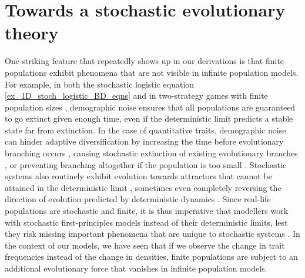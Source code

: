 \section{Towards a stochastic evolutionary theory}

One striking feature that repeatedly shows up in our derivations is that finite populations exhibit phenomena that are not visible in infinite population models. For example, in both the stochastic logistic equation \ref{ex_1D_stoch_logistic_BD_eqns} and in two-strategy games with finite population sizes \citep{tao_stochastic_2007}, demographic noise ensures that all populations are guaranteed to go extinct given enough time, even if the deterministic limit predicts a stable state far from extinction. In the case of quantitative traits, demographic noise can hinder adaptive diversification by increasing the time before evolutionary branching occurs \citep{claessen_delayed_2007, wakano_evolutionary_2013, debarre_evolutionary_2016}, causing stochastic extinction of existing evolutionary branches \citep{rogers_demographic_2012, johansson_will_2006}, or preventing branching altogether if the population is too small \citep{rogers_modes_2015, johnson_two-dimensional_2021}. Stochastic systems also routinely exhibit evolution towards attractors that cannot be attained in the deterministic limit \citep{delong_stochasticity_2023}, sometimes even completely reversing the direction of evolution predicted by deterministic dynamics \citep{constable_demographic_2016,mcleod_social_2019}. Since real-life populations are stochastic and finite, it is thus imperative that modellers work with stochastic first-principles models instead of their deterministic limits, lest they risk missing important phenomena that are unique to stochastic systems \citep{black_stochastic_2012,schreiber_does_2022,hastings_transients_2004,shoemaker_integrating_2020}. In the context of our models, we have seen that if we observe the change in trait frequencies instead of the change in densities, finite populations are subject to an additional evolutionary force that vanishes in infinite population models.

